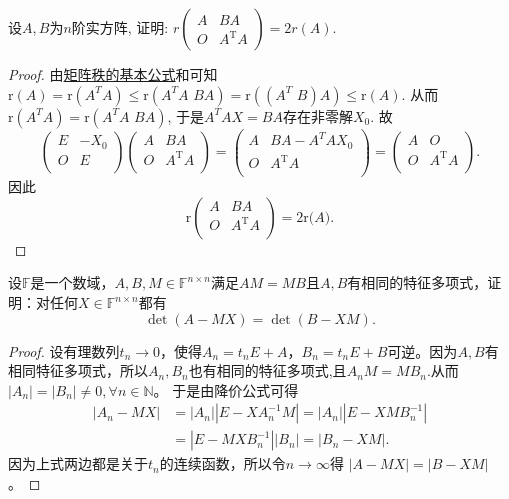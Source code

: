 \documentclass[../../main.tex]{subfiles}
\begin{document}
\begin{example}
设$A,B$为$n$阶实方阵, 证明: $r\begin{pmatrix} A & BA \\ O & A^{\mathrm{T}}A \end{pmatrix}=2r(A)$.
\end{example}
\begin{proof}
由\hyperref[proposition:矩阵秩的基本公式]{矩阵秩的基本公式}和可知
$\mathrm{r}\left( A \right) =\mathrm{r}\left( A^TA \right) \leqslant \mathrm{r}\left( A^TA\,\,BA \right) =\mathrm{r}\left( \left( A^T\,\,B \right) A \right) \leqslant \mathrm{r}\left( A \right) .$
从而$\mathrm{r}\left( A^TA \right) =\mathrm{r}\left( A^TA\,\,BA \right) $, 于是$A^TAX=BA$存在非零解$X_0$. 故
$$\left( \begin{matrix}
E&		-X_0\\
O&		E\\
\end{matrix} \right) \left( \begin{matrix}
A&		BA\\
O&		A^{\mathrm{T}}A\\
\end{matrix} \right) =\left( \begin{matrix}
A&		BA-A^TAX_0\\
O&		A^{\mathrm{T}}A\\
\end{matrix} \right) =\left( \begin{matrix}
A&		O\\
O&		A^{\mathrm{T}}A\\
\end{matrix} \right) .$$
因此
$$\mathrm{r}\left( \begin{matrix}
A&		BA\\
O&		A^{\mathrm{T}}A\\
\end{matrix} \right) =2\mathrm{r(}A).$$

\end{proof}

\begin{example}
设$\mathbb{F}$是一个数域，$A,B,M \in \mathbb{F}^{n \times n}$满足$AM = MB$且$A,B$有相同的特征多项式，证明：对任何$X \in \mathbb{F}^{n \times n}$都有
\[
\det (A - MX) = \det (B - XM). 
\]
\end{example}
\begin{proof}
设有理数列$t_n\rightarrow 0$，使得$A_n=t_nE+A$，$B_n=t_nE+B$可逆。因为$A,B$有相同特征多项式，所以$A_n,B_n$也有相同的特征多项式,且$A_nM=MB_n$.从而 $|A_n|=|B_n|\ne 0,\forall n\in \mathbb{N}$。
于是由降价公式可得
\begin{align*}
|A_n - MX| &= |A_n| |E - X A_n^{-1} M| = |A_n| |E - X M B_n^{-1}| \\
&= |E - M X B_n^{-1}| |B_n| = |B_n - X M|.
\end{align*}
因为上式两边都是关于$t_n$的连续函数，所以令$n\rightarrow \infty$得 $|A - MX| = |B - X M|$。

\end{proof}
\end{document}
